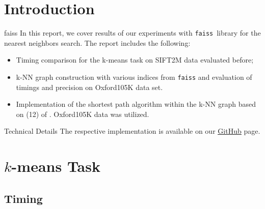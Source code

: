 \section{Introduction}

\begin{frame}
	\begin{block}{faiss}
		In this report, we cover results of our experiments with \texttt{faiss}\footnotemark \, library \cite{Johnson2017} for the nearest neighbors search. The report includes the following:
		\begin{itemize}
			\item Timing comparison for the k-means task on SIFT2M data evaluated before;
			\item k-NN graph construction with various indices from \texttt{faiss} and evaluation of timings and precision on Oxford105K data set.
			\item Implementation of the shortest path algorithm within the k-NN graph based on (12) of \cite{Johnson2017}. Oxford105K data was utilized.
		\end{itemize}
	\end{block}
	
	\begin{block}{Technical Details}
		The respective implementation is available on our \href{https://github.com/salisaresama/computer-vision}{{\color{blue}\underline{GitHub}}} page.
	\end{block}
	
	\addtocounter{footnote}{-1}
\end{frame}


\section{$k$-means Task}
\subsection{Timing}


